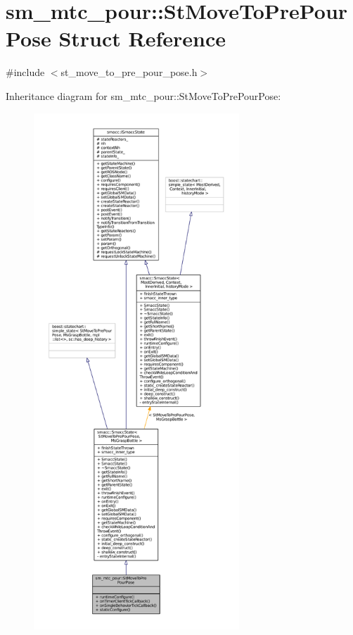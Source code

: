 \hypertarget{structsm__mtc__pour_1_1StMoveToPrePourPose}{}\section{sm\+\_\+mtc\+\_\+pour\+:\+:St\+Move\+To\+Pre\+Pour\+Pose Struct Reference}
\label{structsm__mtc__pour_1_1StMoveToPrePourPose}


{\ttfamily \#include $<$st\+\_\+move\+\_\+to\+\_\+pre\+\_\+pour\+\_\+pose.\+h$>$}



Inheritance diagram for sm\+\_\+mtc\+\_\+pour\+:\+:St\+Move\+To\+Pre\+Pour\+Pose\+:
\nopagebreak
\begin{figure}[H]
\begin{center}
\leavevmode
\includegraphics[height=550pt]{structsm__mtc__pour_1_1StMoveToPrePourPose__inherit__graph}
\end{center}
\end{figure}


